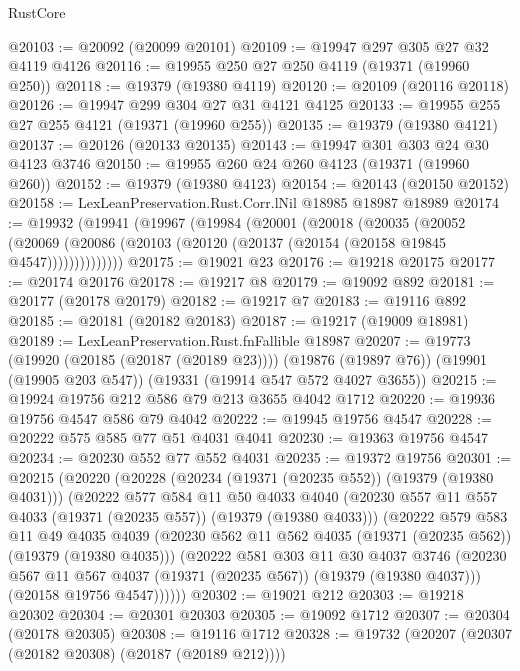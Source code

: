 \begin{lexlean}{RustCore}
\begin{coremodule}
@20103 := @20092 (@20099 @20101)
@20109 := @19947 @297 @305 @27 @32 @4119 @4126
@20116 := @19955 @250 @27 @250 @4119 (@19371 (@19960 @250))
@20118 := @19379 (@19380 @4119)
@20120 := @20109 (@20116 @20118)
@20126 := @19947 @299 @304 @27 @31 @4121 @4125
@20133 := @19955 @255 @27 @255 @4121 (@19371 (@19960 @255))
@20135 := @19379 (@19380 @4121)
@20137 := @20126 (@20133 @20135)
@20143 := @19947 @301 @303 @24 @30 @4123 @3746
@20150 := @19955 @260 @24 @260 @4123 (@19371 (@19960 @260))
@20152 := @19379 (@19380 @4123)
@20154 := @20143 (@20150 @20152)
@20158 := LexLeanPreservation.Rust.Corr.lNil @18985 @18987 @18989
@20174 := @19932
    (@19941
      (@19967
        (@19984
          (@20001
            (@20018
              (@20035
                (@20052
                  (@20069 (@20086 (@20103 (@20120 (@20137 (@20154 (@20158 @19845 @4547))))))))))))))
@20175 := @19021 @23
@20176 := @19218 @20175
@20177 := @20174 @20176
@20178 := @19217 @8
@20179 := @19092 @892
@20181 := @20177 (@20178 @20179)
@20182 := @19217 @7
@20183 := @19116 @892
@20185 := @20181 (@20182 @20183)
@20187 := @19217 (@19009 @18981)
@20189 := LexLeanPreservation.Rust.fnFallible @18987
@20207 := @19773
    (@19920 (@20185 (@20187 (@20189 @23))))
    (@19876 (@19897 @76))
    (@19901 (@19905 @203 @547))
    (@19331 (@19914 @547 @572 @4027 @3655))
@20215 := @19924 @19756 @212 @586 @79 @213 @3655 @4042 @1712
@20220 := @19936 @19756 @4547 @586 @79 @4042
@20222 := @19945 @19756 @4547
@20228 := @20222 @575 @585 @77 @51 @4031 @4041
@20230 := @19363 @19756 @4547
@20234 := @20230 @552 @77 @552 @4031
@20235 := @19372 @19756
@20301 := @20215
    (@20220
      (@20228
        (@20234 (@19371 (@20235 @552)) (@19379 (@19380 @4031)))
        (@20222
          @577
          @584
          @11
          @50
          @4033
          @4040
          (@20230 @557 @11 @557 @4033 (@19371 (@20235 @557)) (@19379 (@19380 @4033)))
          (@20222
            @579
            @583
            @11
            @49
            @4035
            @4039
            (@20230 @562 @11 @562 @4035 (@19371 (@20235 @562)) (@19379 (@19380 @4035)))
            (@20222
              @581
              @303
              @11
              @30
              @4037
              @3746
              (@20230 @567 @11 @567 @4037 (@19371 (@20235 @567)) (@19379 (@19380 @4037)))
              (@20158 @19756 @4547))))))
@20302 := @19021 @212
@20303 := @19218 @20302
@20304 := @20301 @20303
@20305 := @19092 @1712
@20307 := @20304 (@20178 @20305)
@20308 := @19116 @1712
@20328 := @19732
    (@20207 (@20307 (@20182 @20308) (@20187 (@20189 @212))))

\end{coremodule}
\end{lexlean}
